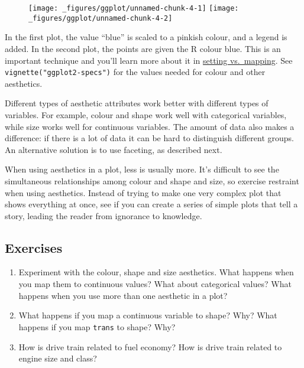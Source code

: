 \begin{figure}[H]
  \texttt{[image: \_figures/ggplot/unnamed-chunk-4-1]}%
  \texttt{[image: \_figures/ggplot/unnamed-chunk-4-2]}
\end{figure}

In the first plot, the value ``blue'' is scaled to a pinkish colour, and
a legend is added. In the second plot, the points are given the R colour
blue. This is an important technique and you'll learn more about it in
\hyperref[sub:setting-mapping]{setting vs.~mapping}. See
\texttt{vignette("ggplot2-specs")} for the values needed for colour and
other aesthetics.

Different types of aesthetic attributes work better with different types
of variables. For example, colour and shape work well with categorical
variables, while size works well for continuous variables. The amount of
data also makes a difference: if there is a lot of data it can be hard
to distinguish different groups. An alternative solution is to use
faceting, as described next.

When using aesthetics in a plot, less is usually more. It's difficult to
see the simultaneous relationships among colour and shape and size, so
exercise restraint when using aesthetics. Instead of trying to make one
very complex plot that shows everything at once, see if you can create a
series of simple plots that tell a story, leading the reader from
ignorance to knowledge.

\subsection{Exercises}

\begin{enumerate}
\def\labelenumi{\arabic{enumi}.}
\item
  Experiment with the colour, shape and size aesthetics. What happens
  when you map them to continuous values? What about categorical values?
  What happens when you use more than one aesthetic in a plot?
\item
  What happens if you map a continuous variable to shape? Why? What
  happens if you map \texttt{trans} to shape? Why?
\item
  How is drive train related to fuel economy? How is drive train related
  to engine size and class?
\end{enumerate}


